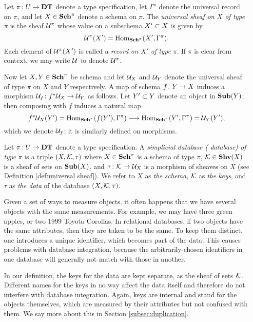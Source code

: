 \documentclass{amsart}
\begin{document}
\begin{definition}\label{def:universal sheaf}

Let $\pi\taking U\to\DT$ denote a type specification, let $\Gamma^\pi$ denote the universal record on $\pi$, and let $X\in\Sch^\pi$ denote a schema on $\pi$.  The {\em universal sheaf on $X$ of type $\pi$} is the sheaf $\mcU^\pi$ whose value on a subschema $X'\ss X$ is given by $$\mcU^\pi(X')=\Hom_{\Sch^\pi}(X',\Gamma^\pi).$$  Each element of $\mcU^\pi(X')$ is called a {\em record on $X'$ of type $\pi$}.  If $\pi$ is clear from context, we may write $\mcU$ to denote $\mcU^\pi$.

Now let $X,Y\in\Sch^\pi$ be schema and let $\mcU_X$ and $\mcU_Y$ denote the universal sheaf of type $\pi$ on $X$ and $Y$ respectively.  A map of schema $f\taking Y \to X$ induces a morphism $\mcU_f\taking f^*\mcU_X\to\mcU_Y$ as follows.  Let $Y'\ss Y$ denote an object in $\Sub(Y)$; then composing with $f$ induces a natural map $$f^*\mcU_X(Y')=\Hom_{\Sch^\pi}(f(Y'),\Gamma^\pi)\too\Hom_{\Sch^\pi}(Y',\Gamma^\pi)=\mcU_Y(Y'),$$ which we denote $\mcU_f$; it is similarly defined on morphisms.

\end{definition}

\begin{definition}\label{def:database objects}

Let $\pi\taking U\to\DT$ denote a type specification.  A {\em simplicial database ( database) of type $\pi$} is a triple $(X,\mcK,\tau)$ where $X\in\Sch^\pi$ is a schema of type $\pi$, $\mcK\in\Shv(X)$ is a sheaf of sets on $\Sub(X)$, and $\tau\taking\mcK\to\mcU_X$ is a morphism of sheaves on $X$ (see Definition \ref{def:universal sheaf}).  We refer to $X$ as {\em the schema}, $\mcK$ as {\em the keys}, and $\tau$ as {\em the data} of the database $(X,\mcK,\tau)$.

\end{definition}

\begin{remark}\label{rem:internal keys}

Given a set of ways to measure objects, it often happens that we have several objects with the same measurements.  For example, we may have three green apples, or two 1999 Toyota Corollas.  In relational databases, if two objects have the same attributes, then they are taken to be the same.  To keep them distinct, one introduces a unique identifier, which becomes part of the data.  This causes problems with database integration, because the arbitrarily-chosen identifiers in one database will generally not match with those in another.

In our definition, the keys for the data are kept separate, as the sheaf of sets $\mcK$.  Different names for the keys in no way affect the data itself and therefore do not interfere with database integration.  Again, keys are internal and stand for the objects themselves, which are measured by their attributes but not confused with them.  We say more about this in Section \ref{subsec:duplication}.

\end{remark}
\end{document}
